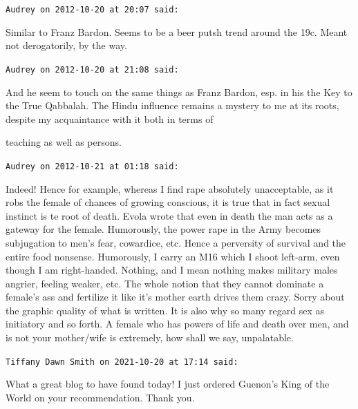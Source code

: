 \begin{footnotesize}\begin{sffamily}



\texttt{Audrey on 2012-10-20 at 20:07 said: }

Similar to Franz Bardon. Seems to be a beer putsh trend around the 19c. Meant not derogatorily, by the way.


\hfill

\texttt{Audrey on 2012-10-20 at 21:08 said: }

And he seem to touch on the same things as Franz Bardon, esp. in his the Key to the True Qabbalah. The Hindu influence remains a mystery to me at its roots, despite my acquaintance with it both in terms of

teaching as well as persons.


\hfill

\texttt{Audrey on 2012-10-21 at 01:18 said: }

Indeed! Hence for example, whereas I find rape absolutely unacceptable, as it robs the female of chances of growing conscious, it is true that in fact sexual instinct is te root of death. Evola wrote that even in death the man acts as a gateway for the female. Humorously, the power rape in the Army becomes subjugation to men's fear, cowardice, etc. Hence a perversity of survival and the entire food nonsense. Humorously, I carry an M16 which I shoot left-arm, even though I am right-handed. Nothing, and I mean nothing makes military males angrier, feeling weaker, etc. The whole notion that they cannot dominate a female's ass and fertilize it like it's mother earth drives them crazy. Sorry about the graphic quality of what is written. It is also why so many regard sex as initiatory and so forth. A female who has powers of life and death over men, and is not your mother/wife is extremely, how shall we say, unpalatable.


\hfill

\texttt{Tiffany Dawn Smith on 2021-10-20 at 17:14 said: }

What a great blog to have found today! I just ordered Guenon's King of the World on your recommendation. Thank you.


\end{sffamily}\end{footnotesize}
